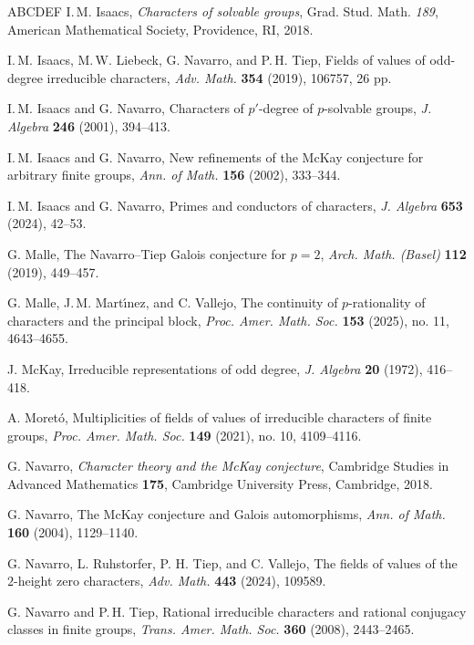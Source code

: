 \documentclass[12pt]{amsart}
\theoremstyle{definition}
\numberwithin{equation}{section}
\begin{document}
\begin{thebibliography}{ABCDEF}
{\sc I.\,M. Isaacs}, \emph{Characters of solvable groups}, Grad.
Stud. Math. \emph{189}, American Mathematical Society, Providence,
RI, 2018.

{\sc I.\,M. Isaacs, M.\,W. Liebeck, G. Navarro, and P.\,H. Tiep},
Fields of values of odd-degree irreducible characters, \emph{Adv.
Math.} \textbf{354} (2019), 106757, 26 pp.

{\sc I.\,M. Isaacs and G. Navarro}, Characters of $p'$-degree of
$p$-solvable groups, \emph{J. Algebra} \textbf{246} (2001),
394--413.

{\sc I.\,M. Isaacs and G. Navarro}, New refinements of the McKay
conjecture for arbitrary finite groups, \emph{Ann. of Math.}
\textbf{156} (2002), 333--344.

 {\sc I.\,M. Isaacs and G. Navarro}, Primes and conductors of characters,
 \emph{J. Algebra} \textbf{653} (2024), 42--53.

{\sc G. Malle}, The Navarro--Tiep Galois conjecture for $p=2$,
\emph{Arch. Math. (Basel)} \textbf{112} (2019), 449--457.

{\sc G. Malle, J.\,M. Mart\'{\i}nez, and C. Vallejo}, The continuity
of $p$-rationality of characters and the principal block,
\emph{Proc. Amer. Math. Soc.} \textbf{153} (2025), no. 11,
4643--4655.

{\sc J. McKay}, Irreducible representations of odd degree, \emph{J.
Algebra} \textbf{20} (1972), 416--418.

{\sc A. Moret\'{o}}, Multiplicities of fields of values of
irreducible characters of finite groups, \emph{Proc. Amer. Math.
Soc.} \textbf{149} (2021), no. 10, 4109--4116.

{\sc G. Navarro}, \emph{Character theory and the McKay conjecture},
Cambridge Studies in Advanced Mathematics \textbf{175}, Cambridge
University Press, Cambridge,
  2018.

%
{\sc G. Navarro}, The McKay conjecture and Galois automorphisms,
\emph{Ann. of Math.} \textbf{160} (2004), 1129--1140.


{\sc G. Navarro, L. Ruhstorfer, P. H. Tiep, and C. Vallejo}, The
fields of values of the $2$-height zero characters, \emph{Adv.
Math.} \textbf{443} (2024), 109589.

{\sc G. Navarro and P.\,H. Tiep}, Rational irreducible characters
and rational conjugacy classes in finite groups,
  \emph{Trans. Amer. Math. Soc.} \textbf{360} (2008), 2443--2465.


\end{thebibliography}
\end{document}
